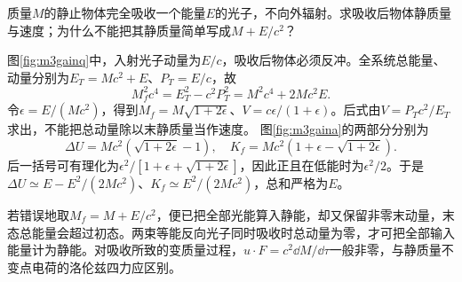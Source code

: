 \begin{example}\label{ex:m3massgain}
质量$M$的静止物体完全吸收一个能量$E$的光子，不向外辐射。求吸收后物体静质量与速度；为什么不能把其静质量简单写成$M+E/c^2$？
\end{example}
\begin{solution}
图\ref{fig:m3gainq}中，入射光子动量为$E/c$，吸收后物体必须反冲。全系统总能量、动量分别为$E_T=Mc^2+E$、$P_T=E/c$，故
\[
 M_f^2c^4=E_T^2-c^2P_T^2=M^2c^4+2Mc^2E.
\]
令$\epsilon=E/(Mc^2)$，得到$M_f=M\sqrt{1+2\epsilon}$、$V=c\epsilon/(1+\epsilon)$。后式由$V=P_Tc^2/E_T$求出，不能把总动量除以末静质量当作速度。
图\ref{fig:m3gaina}的两部分分别为
\[
 \Delta U=Mc^2(\sqrt{1+2\epsilon}-1),\quad
 K_f=Mc^2(1+\epsilon-\sqrt{1+2\epsilon}).
\]
后一括号可有理化为$\epsilon^2/[1+\epsilon+\sqrt{1+2\epsilon}]$，因此正且在低能时为$\epsilon^2/2$。于是$\Delta U\simeq E-E^2/(2Mc^2)$、$K_f\simeq E^2/(2Mc^2)$，总和严格为$E$。

若错误地取$M_f=M+E/c^2$，便已把全部光能算入静能，却又保留非零末动量，末态总能量会超过初态。两束等能反向光子同时吸收时总动量为零，才可把全部输入能量计为静能。对吸收所致的变质量过程，$u\cdot F=c^2\dd M/\dd\tau$一般非零，与静质量不变点电荷的洛伦兹四力应区别。
\end{solution}


